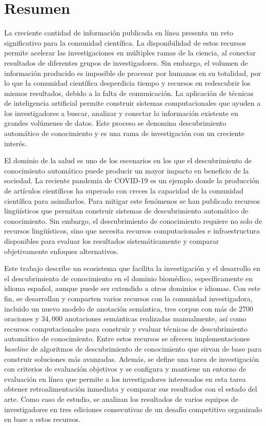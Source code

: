 \chapter*{Resumen}

La creciente cantidad de información publicada en línea presenta un reto significativo para la comunidad científica. La disponibilidad de estos recursos permite acelerar las investigaciones en múltiples ramas de la ciencia, al conectar resultados de diferentes grupos de investigadores. Sin embargo, el volumen de información producido es imposible de procesar por humanos en su totalidad, por lo que la comunidad científica desperdicia tiempo y recursos en redescubrir los mismos resultados, debido a la falta de comunicación. La aplicación de técnicas de inteligencia artificial permite construir sistemas computacionales que ayuden a los investigadores a buscar, analizar y conectar la información existente en grandes volúmenes de datos. Este proceso se denomina descubrimiento automático de conocimiento y es una rama de investigación con un creciente interés.

El dominio de la salud es uno de los escenarios en los que el descubrimiento de conocimiento automático puede  producir un mayor impacto en beneficio de la sociedad. La reciente pandemia de COVID-19 es un ejemplo donde la producción de artículos científicos ha superado con creces la capacidad de la comunidad científica para asimilarlos. Para mitigar este fenómenos se han publicado recursos lingüísticos que permitan construir sistemas de descubrimiento automático de conocimiento.
Sin embargo, el descubrimiento de conocimiento requiere no solo de recursos lingüísticos, sino que necesita recursos computacionales e infraestructura disponibles para evaluar los resultados sistemáticamente y comparar objetivamente enfoques alternativos.

Este trabajo describe un ecosistema que facilita la investigación y el desarrollo en el descubrimiento de conocimiento en el dominio biomédico, específicamente en idioma español, aunque puede ser extendido a otros dominios e idiomas. Con este fin, se desarrollan y comparten varios recursos con la comunidad investigadora, incluido un nuevo modelo de anotación semántica, tres corpus con más de $2700$ oraciones y $34,000$ anotaciones semánticas realizadas manualmente, así como recursos computacionales para construir y evaluar técnicas de descubrimiento automático de conocimiento.
Entre estos recursos se ofrecen implementaciones \textit{baseline} de algoritmos de descubrimiento de conocimiento que sirvan de base para construir soluciones más avanzadas.
Además, se define una tarea de investigación con criterios de evaluación objetivos y se configura y mantiene un entorno de evaluación en línea que permite a los investigadores interesados en esta tarea obtener retroalimentación inmediata y comparar sus resultados con el estado del arte.
Como caso de estudio, se analizan los resultados de varios equipos de investigadores en tres ediciones consecutivas de un desafío competitivo organizado en base a estos recursos.

